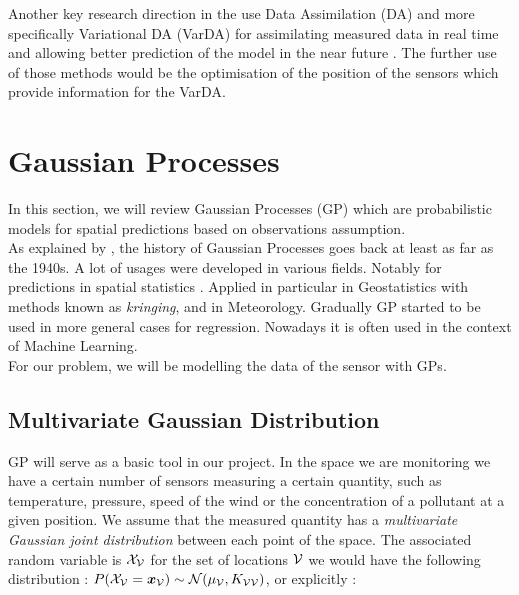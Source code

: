 Another key research direction in the use Data Assimilation (DA) and more specifically Variational DA (VarDA) for assimilating measured data in real time and allowing better prediction of the model in the near future \citep{arcucci_effective_2018}. The further use of those methods would be the optimisation of the position of the sensors which provide information for the VarDA.


\section{Gaussian Processes}\label{sec:theory:gp}

In this section, we will review Gaussian Processes (GP) which are probabilistic models for spatial predictions based on observations assumption. \\ 

As explained by \citet[p.~29]{rasmussen_gaussian_2006}, the history of Gaussian Processes goes back at least as far as the 1940s. A lot of usages were developed in various fields. Notably for predictions in spatial statistics \citep{cressie_statistics_1991}.  Applied in particular in Geostatistics with methods known as \textit{kringing}, and in Meteorology. Gradually GP started to be used in more general cases for regression. Nowadays it is often used in the context of Machine Learning. \\


For our problem, we will be modelling the data of the sensor with GPs.



\subsection{Multivariate Gaussian Distribution}

GP will serve as a basic tool in our project. In the space we are monitoring we have a certain number of sensors measuring a certain quantity, such as temperature, pressure, speed of the wind or the concentration of a pollutant at a given position. We assume that the measured quantity has a \textit{multivariate Gaussian joint distribution} between each point of the space. The associated random variable is $\mathcal{X}_{\mathcal{V}}$ for the set of locations $\mathcal{V}$ we would have the following distribution : $P(\mathcal{X}_{\mathcal{V}} = {\boldsymbol{{x}}}_{\mathcal{V}}) \sim \mathcal{N}(\mu_{\mathcal{V}}, K_{\mathcal{V}\mathcal{V}}) $, or explicitly : 



